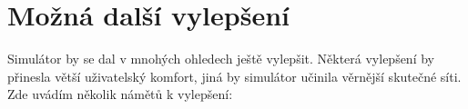\chapter{Možná další vylepšení}

Simulátor by se dal v mnohých ohledech ještě vylepšit. Některá vylepšení by přinesla větší uživatelský komfort, jiná by simulátor učinila věrnější skutečné síti. Zde uvádím několik námětů k vylepšení:

% 
% 
% 
% 

